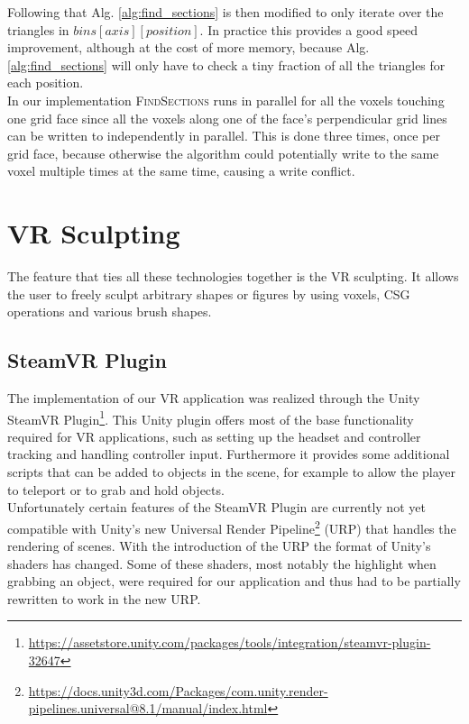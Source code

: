 Following that Alg. \ref{alg:find_sections} is then modified to only iterate over the triangles in $bins[axis][position]$.
In practice this provides a good speed improvement, although at the cost of more memory, because Alg. \ref{alg:find_sections} will
only have to check a tiny fraction of all the triangles for each position.\\
In our implementation \textsc{FindSections} runs in parallel for all the voxels touching one grid face since all the voxels along one
of the face's perpendicular grid lines can be written to independently in parallel. This is done three times, once per grid face, because otherwise the algorithm could potentially write to the same voxel multiple times at the same time, causing a write conflict.

\section{VR Sculpting}

The feature that ties all these technologies together is the VR sculpting. It allows the user to freely sculpt arbitrary shapes or figures by using voxels, CSG operations and various brush shapes.

\subsection{SteamVR Plugin}

The implementation of our VR application was realized through the Unity SteamVR Plugin\footnote{\url{https://assetstore.unity.com/packages/tools/integration/steamvr-plugin-32647}}. This Unity plugin offers most of the base functionality required for VR applications, such as setting up the headset and controller tracking and handling controller input. Furthermore it provides some additional scripts that can be added to objects in the scene, for example to allow the player to teleport or to grab and hold objects.\\
Unfortunately certain features of the SteamVR Plugin are currently not yet compatible with Unity's new Universal Render Pipeline\footnote{\url{https://docs.unity3d.com/Packages/com.unity.render-pipelines.universal@8.1/manual/index.html}} (URP) that handles the rendering of scenes. With the introduction of the URP the format of Unity's
shaders has changed. Some of these shaders, most notably the highlight when grabbing an object, were required for our application and thus had to be partially rewritten to work in the new URP.

